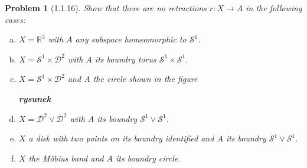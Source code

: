 \documentclass[11pt, a4paper, final]{amsart}
\newcommand{\R}{{\mathbb{R}}}
\newcommand\todo[1]{\textbf{\textcolor{redd}{#1}}}
\newcommand{\sphere}{\mathcal{S}}
\newcommand{\disk}{\mathcal{D}}
\numberwithin{theorem}{section}
\newtheorem{problem}[theorem]{Problem}
\theoremstyle{definition}
\theoremstyle{remark}
\begin{document}
\begin{problem}[1.1.16]\label{problem: 1.1.16}
    Show that there are no retractions $r:X \rightarrow A$ in the following cases:
    \begin{enumerate}[(a)]
        \item $X = \R^3$ with $A$ any subspace homeomorphic to $\sphere^1$.
        
        \item $X = \sphere^1 \times \disk^2$ with $A$ its boundry torus $\sphere^1 \times \sphere^1$.
        
        \item $X = \sphere^1 \times \disk^2$ and $A$ the circle shown in the figure

        \todo{rysunek}

        \item $X = \disk^2 \vee \disk^2$ with $A$ its boundry $\sphere^1 \vee \sphere^1$.

        \item $X$ a disk with two points on its boundry identified and $A$ its boundry $\sphere^1 \vee \sphere^1$.

        \item $X$ the M\"obius band and $A$ its boundry circle.
    \end{enumerate}
\end{problem}
\end{document}
